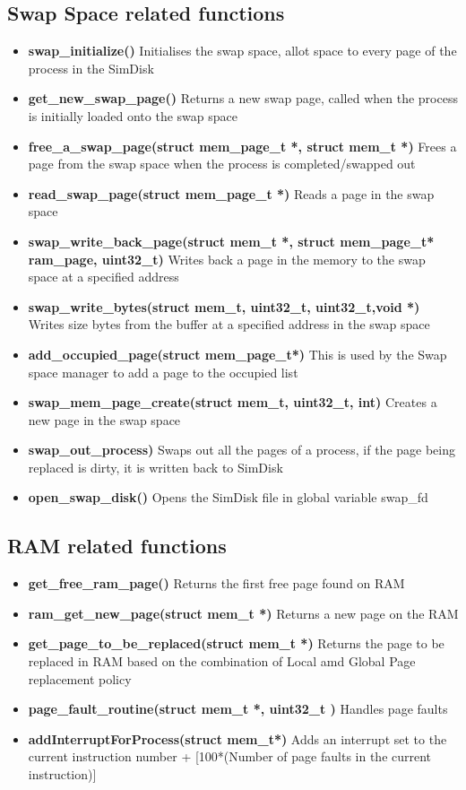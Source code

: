 \documentclass[paper=a4, fontsize=11pt,twoside]{scrartcl}   %
\begin{document}
\subsection{Swap Space related functions}
\begin{itemize}
\item \textbf{swap\_initialize()} Initialises the swap space, allot space to every page of the process in the SimDisk
\item \textbf{get\_new\_swap\_page()} Returns a new swap page, called when the process is initially loaded onto the swap space
\item \textbf{free\_a\_swap\_page(struct mem\_page\_t *, struct mem\_t *)} Frees a page from the swap space when the process is completed/swapped out
\item \textbf{read\_swap\_page(struct mem\_page\_t *)} Reads a page in the swap space
\item \textbf{swap\_write\_back\_page(struct mem\_t *, struct mem\_page\_t* ram\_page, uint32\_t)} Writes back a page in the memory to the swap space at a specified address
\item \textbf{swap\_write\_bytes(struct mem\_t, uint32\_t, uint32\_t,void *)} Writes size bytes from the buffer at a specified address in the swap space
\item \textbf{add\_occupied\_page(struct mem\_page\_t*)} This is used by the Swap space manager to add a page to the occupied list

\item \textbf{swap\_mem\_page\_create(struct mem\_t, uint32\_t, int)} Creates a new page in the swap space
\item \textbf{swap\_out\_process)} Swaps out all the pages of a process, if the page being replaced is dirty, it is written back to SimDisk
\item \textbf{open\_swap\_disk()} Opens the SimDisk file in global variable swap\_fd
\end{itemize}


\subsection{RAM related functions}
\begin{itemize}
\item \textbf{get\_free\_ram\_page()} Returns the first free page found on RAM
\item \textbf{ram\_get\_new\_page(struct mem\_t *)} Returns a new page on the RAM
\item \textbf{get\_page\_to\_be\_replaced(struct mem\_t *)} Returns the page to be replaced in RAM based on the combination of Local amd Global Page replacement policy
\item \textbf{page\_fault\_routine(struct mem\_t *, uint32\_t )} Handles page faults
\item \textbf{addInterruptForProcess(struct mem\_t*)} Adds an interrupt set to the current instruction number + [100*(Number of page faults in the current instruction)]
\end{itemize}
\end{document}
